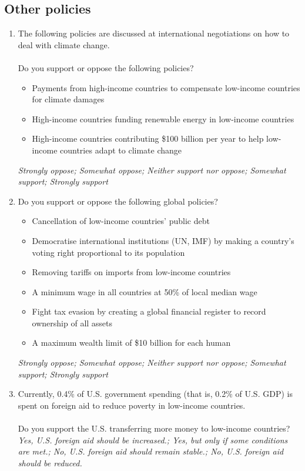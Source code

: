 \subsection*{Other policies}
\begin{enumerate}[resume] \item The following policies are discussed  at international negotiations on how to deal with climate change. \\
\\
Do you support or oppose the following policies?
\begin{itemize}
    \item Payments from high-income countries to compensate low-income countries for climate damages 
    \item High-income countries funding renewable energy in low-income countries
    \item High-income countries contributing \$100 billion per year to help low-income countries adapt to climate change
\end{itemize}
\textit{Strongly oppose; Somewhat oppose; Neither support nor oppose; Somewhat support; Strongly support}
\item Do you support or oppose the following global policies?
\begin{itemize}
    \item Cancellation of low-income countries' public debt 
    \item Democratise international institutions (UN, IMF) by making a country's voting right proportional to its population 
    \item Removing tariffs on imports from low-income countries
    \item A minimum wage in all countries at 50\% of local median wage
    \item Fight tax evasion by creating a global financial register to record ownership of all assets
    \item A maximum wealth limit of \$10 billion for each human 
\end{itemize}
\textit{Strongly oppose; Somewhat oppose; Neither support nor oppose; Somewhat support; Strongly support}
\item Currently, 0.4\% of U.S. government spending (that is, 0.2\% of U.S. GDP) is spent on foreign aid to reduce poverty in low-income countries.\\
\\
Do you support the U.S. transferring more money to low-income countries?
\\ \textit{Yes, U.S. foreign aid should be increased.; Yes, but only if some conditions are met.; No, U.S. foreign aid should remain stable.; No, U.S. foreign aid should be reduced.}

\end{enumerate}
